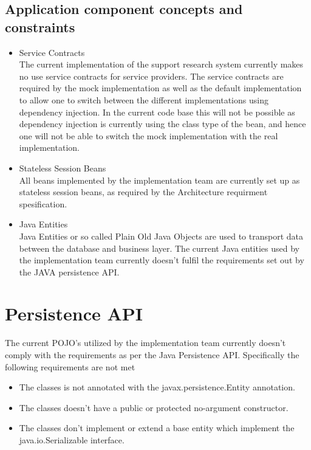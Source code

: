 \documentclass[a4paper,10pt]{article}
\begin{document}
\subsection{Application component concepts and constraints}
\begin{itemize}
	\item Service Contracts\\
	The current implementation of the support research system currently makes no use service contracts for service providers. The service contracts are required by the mock implementation as well as the default implementation to allow one to switch between the different implementations using dependency injection. In the current code base this will not be possible as dependency injection is currently using the class type of the bean, and hence one will not be able to switch the mock implementation with the real implementation.

	\item Stateless Session Beans\\
	All beans implemented by the implementation team are currently set up as stateless session beans, as required by the Architecture requirment spesification.

	\item Java Entities\\
	Java Entities or so called Plain Old Java Objects are used to transport data between the database and business layer. The current Java entities used by the implementation team currently doesn't fulfil the requirements set out by the  JAVA persistence API.
\end{itemize}

\section{Persistence API}
The current POJO's utilized by the implementation team currently doesn't comply with the requirements as per the Java Persistence API.  Specifically the following requirements are not met
\begin{itemize}
	\item The classes is not annotated with the javax.persistence.Entity annotation.
	\item The classes doesn't have a public or protected no-argument constructor.
	\item The classes don't implement or extend a base entity which implement the java.io.Serializable interface.
\end{itemize}
\end{document}
